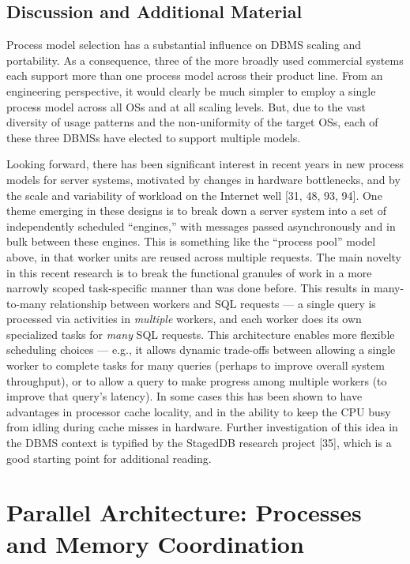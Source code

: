 \documentclass[a4paper,11pt,twoside,openright]{book}
\begin{document}
\hypertarget{discussion-and-additional-material}{%
\section{Discussion and Additional
Material}\label{discussion-and-additional-material}}

Process model selection has a substantial influence on DBMS scaling and
portability. As a consequence, three of the more broadly used commercial
systems each support more than one process model across their product
line. From an engineering perspective, it would clearly be much simpler
to employ a single process model across all OSs and at all scaling
levels. But, due to the vast diversity of usage patterns and the
non-uniformity of the target OSs, each of these three DBMSs have elected
to support multiple models.

Looking forward, there has been significant interest in recent years in
new process models for server systems, motivated by changes in hardware
bottlenecks, and by the scale and variability of workload on the
Internet well {[}31, 48, 93, 94{]}. One theme emerging in these designs
is to break down a server system into a set of independently scheduled
``engines,'' with messages passed asynchronously and in bulk between
these engines. This is something like the ``process pool'' model above,
in that worker units are reused across multiple requests. The main
novelty in this recent research is to break the functional granules of
work in a more narrowly scoped task-specific manner than was done
before. This results in many-to-many relationship between workers and
SQL requests --- a single query is processed via activities in
\emph{multiple} workers, and each worker does its own specialized tasks
for \emph{many} SQL requests. This architecture enables more flexible
scheduling choices --- e.g., it allows dynamic trade-offs between
allowing a single worker to complete tasks for many queries (perhaps to
improve overall system throughput), or to allow a query to make progress
among multiple workers (to improve that query's latency). In some cases
this has been shown to have advantages in processor cache locality, and
in the ability to keep the CPU busy from idling during cache misses in
hardware. Further investigation of this idea in the DBMS context is
typified by the StagedDB research project {[}35{]}, which is a good
starting point for additional reading.

\hypertarget{parallel-architecture-processes-and-memory-coordination}{%
\chapter{Parallel Architecture: Processes and Memory
Coordination}\label{parallel-architecture-processes-and-memory-coordination}}
\end{document}
